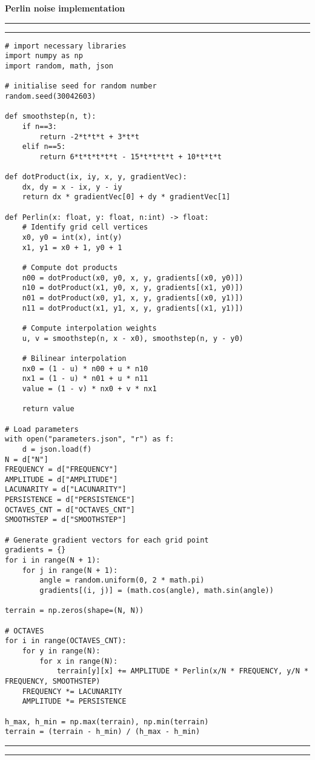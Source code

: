 \textbf{\large{Perlin noise implementation}}
\vspace{2.5pt}
\hrule
\vspace{1mm}
\hrule
\begin{lstlisting}
# import necessary libraries
import numpy as np
import random, math, json

# initialise seed for random number
random.seed(30042603)
    
def smoothstep(n, t):
    if n==3:
        return -2*t*t*t + 3*t*t
    elif n==5:
        return 6*t*t*t*t*t - 15*t*t*t*t + 10*t*t*t

def dotProduct(ix, iy, x, y, gradientVec):
    dx, dy = x - ix, y - iy
    return dx * gradientVec[0] + dy * gradientVec[1]

def Perlin(x: float, y: float, n:int) -> float:
    # Identify grid cell vertices
    x0, y0 = int(x), int(y)
    x1, y1 = x0 + 1, y0 + 1
            
    # Compute dot products
    n00 = dotProduct(x0, y0, x, y, gradients[(x0, y0)])
    n10 = dotProduct(x1, y0, x, y, gradients[(x1, y0)])
    n01 = dotProduct(x0, y1, x, y, gradients[(x0, y1)])
    n11 = dotProduct(x1, y1, x, y, gradients[(x1, y1)])
    
    # Compute interpolation weights
    u, v = smoothstep(n, x - x0), smoothstep(n, y - y0)

    # Bilinear interpolation
    nx0 = (1 - u) * n00 + u * n10
    nx1 = (1 - u) * n01 + u * n11
    value = (1 - v) * nx0 + v * nx1

    return value

# Load parameters
with open("parameters.json", "r") as f:
    d = json.load(f)
N = d["N"]
FREQUENCY = d["FREQUENCY"]
AMPLITUDE = d["AMPLITUDE"]
LACUNARITY = d["LACUNARITY"]
PERSISTENCE = d["PERSISTENCE"]
OCTAVES_CNT = d["OCTAVES_CNT"]
SMOOTHSTEP = d["SMOOTHSTEP"]

# Generate gradient vectors for each grid point
gradients = {}
for i in range(N + 1):
    for j in range(N + 1):
        angle = random.uniform(0, 2 * math.pi)
        gradients[(i, j)] = (math.cos(angle), math.sin(angle))

terrain = np.zeros(shape=(N, N))

# OCTAVES
for i in range(OCTAVES_CNT):  
    for y in range(N):
        for x in range(N):
            terrain[y][x] += AMPLITUDE * Perlin(x/N * FREQUENCY, y/N * FREQUENCY, SMOOTHSTEP)  
    FREQUENCY *= LACUNARITY
    AMPLITUDE *= PERSISTENCE

h_max, h_min = np.max(terrain), np.min(terrain)
terrain = (terrain - h_min) / (h_max - h_min)
\end{lstlisting}
\hrule
\vspace{1mm}
\hrule

